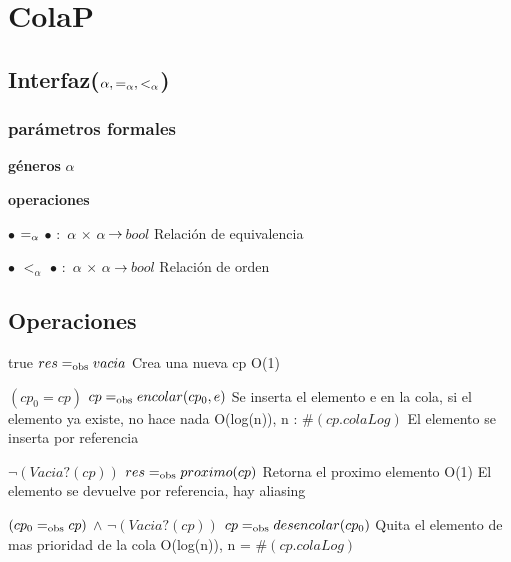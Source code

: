 \section{ColaP}

\subsection{Interfaz($\alpha, \igsub{\alpha}, <_\alpha$)}

\subsubsection{parámetros formales}
	\begin{description}[labelindent=1cm]
	\item[] \textbf{g\'eneros} $\alpha$
	\item[] \textbf{operaciones} 
			\begin{description}[labelindent=1cm] 
			\item[] $\bullet$ $\igsub{\alpha}$ $\bullet$ $:$ $\alpha$ $\times$ $\alpha$ $\!\rightarrow\!$ $bool$ \indent Relación de equivalencia
			\item[] $\bullet$ $<_\alpha$ $\bullet$ $:$ $\alpha$ $\times$ $\alpha$ $\!\rightarrow\!$ $bool$	\indent Relación de orden
			\end{description}
	\end{description}
	

\subsection{Operaciones}

{true}
{$res =_{\mathrm{obs}} vacia$}
{Crea una nueva cp}
{O(1)}
{}

{$(cp_0=cp)$}
{$cp =_{\mathrm{obs}} encolar(cp_0,e)$}
{Se inserta el elemento e en la cola, si el elemento ya existe, no hace nada}
{O(log(n)), n : $\#(cp.colaLog)$}
{El elemento se inserta por referencia}

{$\neg(Vacia?(cp))$}
{$res =_{\mathrm{obs}} proximo(cp)$}
{Retorna el proximo elemento}
{O(1)}
{El elemento se devuelve por referencia, hay aliasing}

{$(cp_0 =_{\mathrm{obs}} cp)$ $\land$ $\neg(Vacia?(cp))$}
{$cp =_{\mathrm{obs}} desencolar(cp_0)$}
{Quita el elemento de mas prioridad de la cola}
{O(log(n)), n = $\#(cp.colaLog)$}
{}

